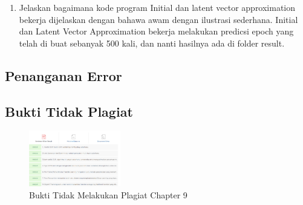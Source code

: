 \begin{enumerate}
		

        	\item Jelaskan bagaimana kode program Initial dan latent vector approximation bekerja dijelaskan dengan bahawa awam dengan ilustrasi sederhana.
Initial dan Latent Vector Approximation bekerja melakukan predicsi epoch yang telah di buat sebanyak 500 kali, dan nanti hasilnya ada di folder result.

		

\end{enumerate}

\subsection{Penanganan Error}
\begin{enumerate}
\begin{itemize}

\end{itemize}
\end{enumerate}

\subsection{Bukti Tidak Plagiat}
\begin{figure}[H]
\centering
	\includegraphics[width=4cm]{figures/1174039/chapter9/bukticekplagiarismechapter9.PNG}
	\caption{Bukti Tidak Melakukan Plagiat Chapter 9}
\end{figure}